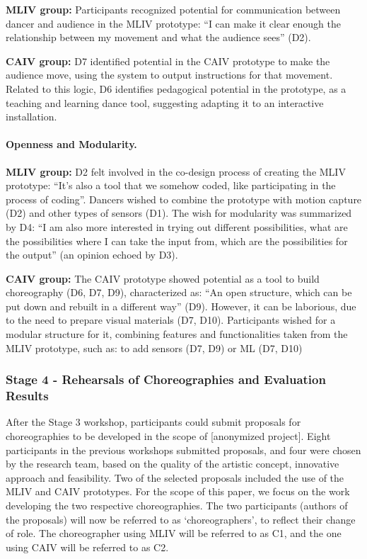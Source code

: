 \textbf{MLIV group:} Participants recognized potential for communication between dancer and audience in the MLIV prototype: “I can make it clear enough the relationship between my movement and what the audience sees” (D2).

\textbf{CAIV group:} D7 identified potential in the CAIV prototype to make the audience move, using the system to output instructions for that movement. Related to this logic, D6 identifies pedagogical potential in the prototype, as a teaching and learning dance tool, suggesting adapting it to an interactive installation.

\paragraph{Openness and Modularity. }

\textbf{MLIV group: }D2 felt involved in the co-design process of creating the MLIV prototype: “It’s also a tool that we somehow coded, like participating in the process of coding”. Dancers wished to combine the prototype with motion capture (D2) and other types of sensors (D1). The wish for modularity was summarized by D4: “I am also more interested in trying out different possibilities, what are the possibilities where I can take the input from, which are the possibilities for the output” (an opinion echoed by D3).

\textbf{CAIV group:} The CAIV prototype showed potential as a tool to build choreography (D6, D7, D9), characterized as: “An open structure, which can be put down and rebuilt in a different way” (D9). However, it can be laborious, due to the need to prepare visual materials (D7, D10). Participants wished for a modular structure for it, combining features and functionalities taken from the MLIV prototype, such as: to add sensors (D7, D9) or ML (D7, D10)

\subsubsection{Stage 4 - Rehearsals of Choreographies and Evaluation Results}

After the Stage 3 workshop, participants could submit proposals for choreographies to be developed in the scope of [anonymized project]. Eight participants in the previous workshops submitted proposals, and four were chosen by the research team, based on the quality of the artistic concept, innovative approach and feasibility. Two of the selected proposals included the use of the MLIV and CAIV prototypes. For the scope of this paper, we focus on the work developing the two respective choreographies. The two participants (authors of the proposals) will now be referred to as ‘choreographers’, to reflect their change of role. The choreographer using MLIV will be referred to as C1, and the one using CAIV will be referred to as C2.

